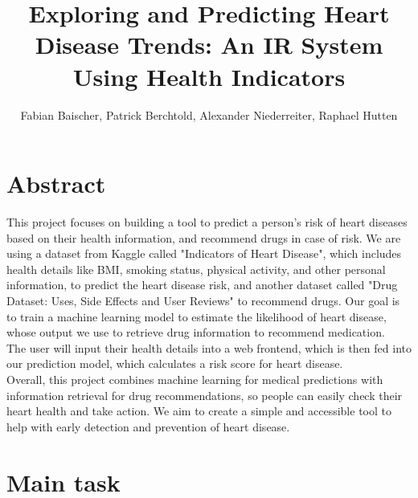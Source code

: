 \documentclass{article}
\title{Exploring and Predicting Heart Disease Trends: An IR System Using  Health Indicators}
\author{Fabian Baischer, Patrick Berchtold, Alexander Niederreiter, Raphael Hutten}
\begin{document}
\maketitle


\section{Abstract}

This project focuses on building a tool to predict a person’s risk of heart diseases based on their health information, and recommend drugs in case of risk.
We are using a dataset from Kaggle called "Indicators of Heart Disease",
which includes health details like BMI, smoking status, physical activity, and other personal information, to predict the heart disease risk,
and another dataset called "Drug Dataset: Uses, Side Effects and User Reviews" to recommend drugs.
Our goal is to train a machine learning model to estimate the likelihood of heart disease,
whose output we use to retrieve drug information to recommend medication.\\
The user will input their health details into a web frontend, which is then fed into our prediction model, which calculates a risk score for heart disease.\\
Overall, this project combines machine learning for medical predictions with information retrieval for drug recommendations,
so people can easily check their heart health and take action.
We aim to create a simple and accessible tool to help with early detection and prevention of heart disease.


\section{Main task}
\end{document}
